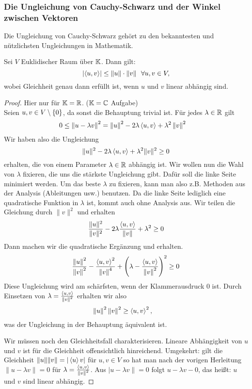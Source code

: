 \subsubsection{Die Ungleichung von Cauchy-Schwarz und der Winkel zwischen Vektoren}

Die Ungleichung von Cauchy-Schwarz gehört zu den bekanntesten und nützlichsten Ungleichungen in Mathematik. 

\begin{thm}
	Sei $ V $ Euklidischer Raum über $ \mathbb K $. Dann gilt:
	\begin{equation}
		\left| \left\langle u,v \right\rangle \right| \leq \left\| u \right\| \cdot \left\| v \right\| \enspace \forall u,v \in V,
	\end{equation}
	wobei Gleichheit genau dann erfüllt ist, wenn $ u $ und $ v $ linear abhängig sind.
\end{thm}
\begin{proof}
	Hier nur für $ \mathbb K = \mathbb R $. ($ \mathbb K = \mathbb C $ Aufgabe) \\[10pt]
	Seien $ u,v \in V \setminus \left\{ 0 \right\} $, da sonst die Behauptung trivial ist. Für jedes $ \lambda \in \mathbb R $ gilt
	\begin{align*}
		0 &\leq \left\| u - \lambda v \right\|^2 = \left\| u \right\|^2 - 2 \lambda \left\langle u,v \right\rangle + \lambda^2 \left\| v \right\|^2
	\end{align*}
	Wir haben also die Ungleichung 
	\[
		\|u\|^2 - 2 \lambda \left\langle u,v \right\rangle + \lambda^2 \|v\|^2 \ge 0
	\]
	erhalten, die von einem Parameter $\lambda \in \mathbb R$ abhängig ist. Wir wollen nun die Wahl von $\lambda$ fixieren, die uns die stärkste Ungleichung gibt. Dafür soll die linke Seite minimiert werden. Um das beste $\lambda$ zu fixieren, kann man also z.B. Methoden aus der Analysis (Ableitungen usw.) benutzen. Da die linke Seite lediglich eine quadratische Funktion in $\lambda$ ist, kommt auch ohne Analysis aus. Wir teilen die Gleichung durch $\|v\|^2$ und erhalten 
	\[
		\frac{\|u\|^2}{\|v\|^2} - 2 \lambda \frac{\left\langle u,v \right\rangle}{\|v\|} + \lambda^2  \ge 0
	\]
	Dann machen wir die quadratische Ergänzung und erhalten.
	\begin{equation*}
		\frac{\left\| u \right\|^2}{\left\| v \right\|^2} - \frac{\left\langle u,v \right\rangle^2}{\left\| v \right\|^4} + \left( \lambda - \frac{\left\langle u,v \right\rangle}{\left\| v \right\|^2} \right)^2 \geq 0
	\end{equation*}
	Diese Ungleichung wird am schärfsten, wenn der Klammerausdruck 0 ist. Durch Einsetzen von $\lambda = \frac{\left\langle u,v \right\rangle}{\left\| v \right\|^2}$ erhalten wir also 
	\begin{align*}
		\left\| u \right\|^2 \left\| v \right\|^2 & \ge \left\langle u,v \right\rangle^2,
	\end{align*}
	was der Ungleichung in der Behauptung äquivalent ist. 
	
	Wir müssen noch den Gleichheitsfall charakterisieren. Lineare Abhängigkeit von $u$ und $v$ ist für die Gleichheit offensichtlich hinreichend. Umgekehrt: gilt die Gleichheit $\|u\| \|v \| = |\left\langle u \right\rangle{v}|$ für $u,v \in V$ so hat man nach der vorigen Herleitung $\|u - \lambda v\| = 0$ für $\lambda =\frac{\left\langle u,v \right\rangle}{\left\| v \right\|^2}$. Aus $|u - \lambda v\| =0$ folgt $u - \lambda v -0$, das heißt: $u$ und $v$ sind linear abhängig. 
\end{proof}


